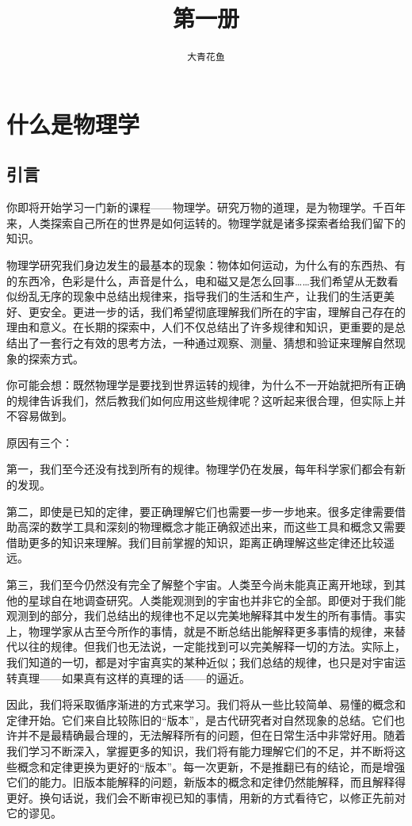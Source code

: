 \documentclass[12pt,UTF8,fontset=none]{ctexbook}
\title{\zihao{0} \bfseries 第一册}
\author{\zihao{2} \texttt{大青花鱼}}
\date{}
\begin{document}
\maketitle
\tableofcontents
\newpage

\chapter{什么是物理学}

\section{引言}

你即将开始学习一门新的课程——物理学。研究万物的道理，是为物理学。千百年来，人类探索自己所在的世界是如何运转的。物理学就是诸多探索者给我们留下的知识。

物理学研究我们身边发生的最基本的现象：物体如何运动，为什么有的东西热、有的东西冷，色彩是什么，声音是什么，电和磁又是怎么回事……我们希望从无数看似纷乱无序的现象中总结出规律来，指导我们的生活和生产，让我们的生活更美好、更安全。更进一步的话，我们希望彻底理解我们所在的宇宙，理解自己存在的理由和意义。在长期的探索中，人们不仅总结出了许多规律和知识，更重要的是总结出了一套行之有效的思考方法，一种通过观察、测量、猜想和验证来理解自然现象的探索方式。

你可能会想：既然物理学是要找到世界运转的规律，为什么不一开始就把所有正确的规律告诉我们，然后教我们如何应用这些规律呢？这听起来很合理，但实际上并不容易做到。

原因有三个：

第一，我们至今还没有找到所有的规律。物理学仍在发展，每年科学家们都会有新的发现。

第二，即使是已知的定律，要正确理解它们也需要一步一步地来。很多定律需要借助高深的数学工具和深刻的物理概念才能正确叙述出来，而这些工具和概念又需要借助更多的知识来理解。我们目前掌握的知识，距离正确理解这些定律还比较遥远。

第三，我们至今仍然没有完全了解整个宇宙。人类至今尚未能真正离开地球，到其他的星球自在地调查研究。人类能观测到的宇宙也并非它的全部。即便对于我们能观测到的部分，我们总结出的规律也不足以完美地解释其中发生的所有事情。事实上，物理学家从古至今所作的事情，就是不断总结出能解释更多事情的规律，来替代以往的规律。但我们也无法说，一定能找到可以完美解释一切的方法。实际上，我们知道的一切，都是对宇宙真实的某种近似；我们总结的规律，也只是对宇宙运转真理——如果真有这样的真理的话——的逼近。

因此，我们将采取循序渐进的方式来学习。我们将从一些比较简单、易懂的概念和定律开始。它们来自比较陈旧的“版本”，是古代研究者对自然现象的总结。它们也许并不是最精确最合理的，无法解释所有的问题，但在日常生活中非常好用。随着我们学习不断深入，掌握更多的知识，我们将有能力理解它们的不足，并不断将这些概念和定律更换为更好的“版本”。每一次更新，不是推翻已有的结论，而是增强它们的能力。旧版本能解释的问题，新版本的概念和定律仍然能解释，而且解释得更好。换句话说，我们会不断审视已知的事情，用新的方式看待它，以修正先前对它的谬见。
\end{document}
